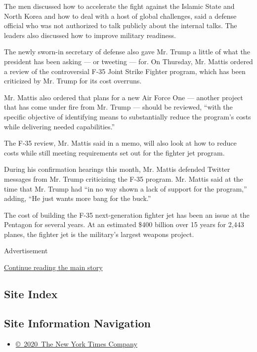 The men discussed how to accelerate the fight against the Islamic State
and North Korea and how to deal with a host of global challenges, said a
defense official who was not authorized to talk publicly about the
internal talks. The leaders also discussed how to improve military
readiness.

The newly sworn-in secretary of defense also gave Mr. Trump a little of
what the president has been asking --- or tweeting --- for. On Thursday,
Mr. Mattis ordered a review of the controversial F-35 Joint Strike
Fighter program, which has been criticized by Mr. Trump for its cost
overruns.

Mr. Mattis also ordered that plans for a new Air Force One --- another
project that has come under fire from Mr. Trump --- should be reviewed,
``with the specific objective of identifying means to substantially
reduce the program's costs while delivering needed capabilities.''

The F-35 review, Mr. Mattis said in a memo, will also look at how to
reduce costs while still meeting requirements set out for the fighter
jet program.

During his confirmation hearings this month, Mr. Mattis defended Twitter
messages from Mr. Trump criticizing the F-35 program. Mr. Mattis said at
the time that Mr. Trump had ``in no way shown a lack of support for the
program,'' adding, ``He just wants more bang for the buck.''

The cost of building the F-35 next-generation fighter jet has been an
issue at the Pentagon for several years. At an estimated \$400 billion
over 15 years for 2,443 planes, the fighter jet is the military's
largest weapons project.

Advertisement

\protect\hyperlink{after-bottom}{Continue reading the main story}

\hypertarget{site-index}{%
\subsection{Site Index}\label{site-index}}

\hypertarget{site-information-navigation}{%
\subsection{Site Information
Navigation}\label{site-information-navigation}}

\begin{itemize}
\tightlist
\item
  \href{https://help.nytimes3xbfgragh.onion/hc/en-us/articles/115014792127-Copyright-notice}{©~2020~The
  New York Times Company}
\end{itemize}

